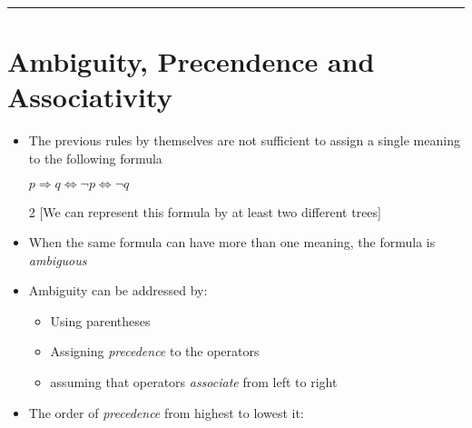 \documentclass{article}
\begin{document}
\begin{center}
  \rule{0.5\textwidth}{0.4pt}
\end{center}

\section{Ambiguity, Precendence and Associativity}
\begin{itemize}
  \item{The previous rules by themselves are not sufficient to assign a single meaning to the following formula}
  \begin{center}
  $p \Rightarrow q \Leftrightarrow \neg{p} \Leftrightarrow \neg{q}$
  \end{center}
  \setlength{\columnsep}{0.3\textwidth}
  \begin{multicols}{2}
    [We can represent this formula by at least two different trees]
  \end{multicols}
  \item{When the same formula can have more than one meaning, the formula is \textit{ambiguous}}
  \item{Ambiguity can be addressed by:}
  \begin{itemize}
    \item{Using parentheses}
    \item{Assigning \textit{precedence} to the operators}
    \item{assuming that operators \textit{associate} from left to right}
  \end{itemize}
  \item{The order of \textit{precedence} from highest to lowest it:}

\end{itemize}
\end{document}
